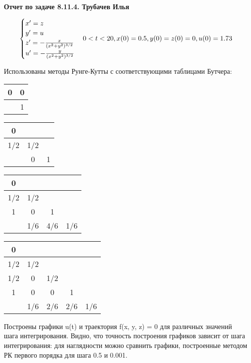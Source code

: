 \documentclass[a4paper, 12pt]{article}
\begin{document}
	\begin{center}
		\textbf{Отчет по задаче 8.11.4. Трубачев Илья}
	\end{center}

	\begin{equation*}
	\begin{cases}
	x' = z \\
	y' = u \\
	z' = -\frac{x}{(x^2 + y^2)^{3/2}} \\
	u' = -\frac{y}{(x^2 + y^2)^{3/2}}
	\end{cases} \\
	0 < t < 20, x(0) = 0.5, y(0) = z(0) = 0, u(0) = 1.73
	\end{equation*}
	
	Использованы методы Рунге-Кутты с соответствующими таблицами Бутчера:
	\begin{center}
	\begin{tabular}{|c|c|}
		\hline
		0 & 0 \\
		\hline
		& 1 \\
		\hline
	\end{tabular}
	\bigskip
	\begin{tabular}{|c|c|c|}
		\hline
		0 &  &  \\
		\hline
		1/2 & 1/2 &  \\
		\hline
		& 0 & 1 \\
		\hline
	\end{tabular}
	\bigskip
	\begin{tabular}{|c|c|c|c|}
		\hline
		0 &  &  &  \\
		\hline
		1/2 & 1/2 &  &  \\
		\hline
		1 & 0 & 1 &  \\
		\hline
		& 1/6 & 4/6 & 1/6 \\
		\hline
	\end{tabular}
	\bigskip
	\begin{tabular}{|c|c|c|c|c|}
		\hline
		0 &  &  &  &  \\
		\hline
		1/2 & 1/2 &  &  &  \\
		\hline
		1/2 & 0 & 1/2 &  &  \\
		\hline
		1 & 0 & 0 & 1 &  \\
		\hline
		& 1/6 & 2/6 & 2/6 & 1/6 \\
		\hline
	\end{tabular}
	\end{center}
	
	Построены графики u(t) и траектория f(x, y, z) = 0 для различных значений шага интегрирования. Видно, что точность построения графиков зависит от шага интегрирования: для наглядности можно сравнить графики, построенные методом РК первого порядка для шага 0.5 и 0.001. 
\end{document}
